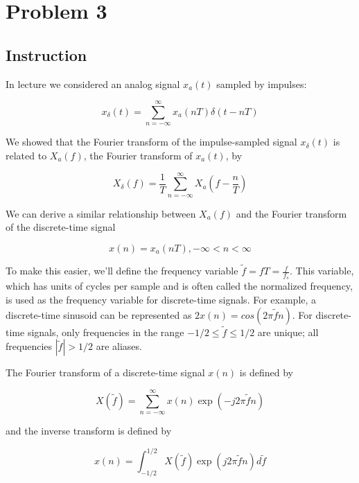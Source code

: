 \section{Problem 3}

\subsection{Instruction}

In lecture we considered an analog signal $x_a (t)$ sampled by impulses:

\begin{equation}
	x_\delta (t) = \sum_{n=-\infty}^{\infty} x_a(nT) \delta(t-nT)
	\label{eq:ex3_analog_signal}
\end{equation}

We showed that the Fourier transform of the impulse-sampled signal $x_\delta (t)$
is related to $X_a (f)$, the Fourier transform of $x_a (t)$, by

\begin{equation}
	X_\delta (f) = \frac{1}{T} \sum_{n=-\infty}^{\infty} X_a(f- \frac{n}{T})
	\label{eq:ex3_FT_sampled_signal}
\end{equation}

We can derive a similar relationship between $X_a (f)$ and the Fourier transform
of the discrete-time signal

\begin{equation}
	x(n) = x_a (nT), − \infty < n < \infty
\end{equation}

To make this easier, we’ll define the frequency variable
$\tilde{f} = f T = \frac{f}{f_s}$. This variable, which has units of cycles per
sample and is often called the normalized frequency, is used as the frequency
variable for discrete-time signals. For example, a discrete-time sinusoid can be
represented as $2x(n) = cos(2\pi \tilde{f}n)$. For discrete-time signals, only
frequencies in the range $− 1/2 \le \tilde{f} \le 1/2$ are unique;
all frequencies $|\tilde{f}| > 1/2$ are aliases.

The Fourier transform of a discrete-time signal $x(n)$ is defined by

\begin{equation}
	X(\tilde{f}) = \sum_{n=-\infty}^{\infty} x(n) \exp{(-j 2 \pi \tilde{f} n)}
	\label{eq:ex3_DFT}
\end{equation}

and the inverse transform is defined by

\begin{equation}
	x(n) = \int_{-1/2}^{1/2} X(\tilde{f}) \exp{(j 2 \pi \tilde{f} n)} d\tilde{f}
	\label{eq:ex3_IDFT}
\end{equation}

